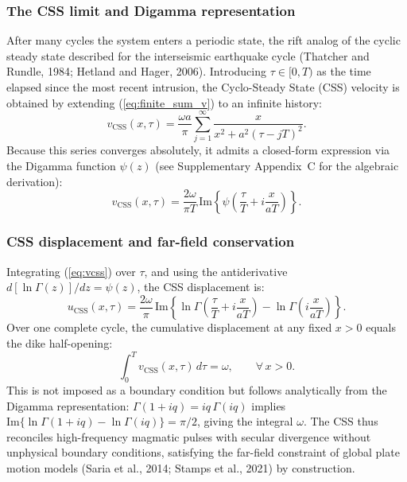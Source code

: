 \documentclass[12pt]{article}
\newcommand{\IM}{\mathrm{Im}}
\begin{document}
\subsubsection{The CSS limit and Digamma representation}

After many cycles the system enters a periodic state, the rift analog of the
cyclic steady state described for the interseismic earthquake cycle (Thatcher
and Rundle, 1984; Hetland and Hager, 2006). Introducing
$\tau\in[0,T)$ as the time elapsed since the most recent intrusion, the
Cyclo-Steady State (CSS) velocity is obtained by extending
(\ref{eq:finite_sum_v}) to an infinite history:
\begin{equation}
v_{\text{CSS}}(x,\tau) = \frac{\omega a}{\pi}
  \sum_{j=1}^{\infty}\frac{x}{x^2 + a^2(\tau-jT)^2}.
\label{eq:css_sum}
\end{equation}
Because this series converges absolutely, it admits a closed-form expression
via the Digamma function $\psi(z)$ (see Supplementary Appendix~C for the
algebraic derivation):
\begin{equation}
\boxed{v_{\text{CSS}}(x,\tau) =
  \frac{2\omega}{\pi T}\,\IM\!\left\{
    \psi\!\left(\frac{\tau}{T}+i\frac{x}{aT}\right)
  \right\}.}
\label{eq:vcss}
\end{equation}

\subsubsection{CSS displacement and far-field conservation}

Integrating (\ref{eq:vcss}) over $\tau$, and using the antiderivative
$d[\ln\Gamma(z)]/dz = \psi(z)$, the CSS displacement is:
\begin{equation}
\boxed{u_{\text{CSS}}(x,\tau) =
  \frac{2\omega}{\pi}\,\IM\!\left\{
    \ln\Gamma\!\left(\frac{\tau}{T}+i\frac{x}{aT}\right)
    -\ln\Gamma\!\left(i\frac{x}{aT}\right)
  \right\}.}
\label{eq:ucss}
\end{equation}
Over one complete cycle, the cumulative displacement at any fixed $x>0$ equals
the dike half-opening:
\begin{equation}
\int_0^T v_{\text{CSS}}(x,\tau)\,d\tau = \omega, \qquad \forall\,x>0.
\label{eq:conservation}
\end{equation}
This is not imposed as a boundary condition but follows analytically from the
Digamma representation: $\Gamma(1+iq) = iq\,\Gamma(iq)$ implies
$\IM\{\ln\Gamma(1+iq)-\ln\Gamma(iq)\} = \pi/2$, giving the integral $\omega$.
The CSS thus reconciles high-frequency magmatic pulses with secular divergence
without unphysical boundary conditions, satisfying the far-field constraint of
global plate motion models (Saria et al., 2014; Stamps et al., 2021) by
construction.
\end{document}

